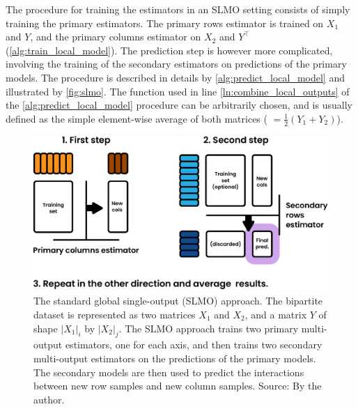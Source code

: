 The procedure for training the estimators in an SLMO setting consists of simply training the primary estimators. The primary rows estimator is trained on $X_1$ and $Y$, and the primary columns estimator on $X_2$ and $Y^\intercal$ (\autoref{alg:train_local_model}). The prediction step is however more complicated, involving the training of the secondary estimators on predictions of the primary models.
The procedure is described in details by \autoref{alg:predict_local_model} and illustrated by \autoref{fig:slmo}. The \KwCombine function used in line \autoref{ln:combine_local_outputs} of the \autoref{alg:predict_local_model} procedure can be arbitrarily chosen, and is usually defined as the simple element-wise average of both matrices ( $= \frac{1}{2}(Y_1 + Y_2)$).

\begin{figure}[tb]
    \centering
    \includegraphics[width=.6\textwidth]{figures/lmo.pdf}
    \caption{
        The standard global single-output (SLMO) approach. The bipartite dataset is represented as two matrices $X_1$ and $X_2$, and a matrix $Y$ of shape $|X_1|_i$ by $|X_2|_j$. The SLMO approach trains two primary multi-output estimators, one for each axis, and then trains two secondary multi-output estimators on the predictions of the primary models. The secondary models are then used to predict the interactions between new row samples and new column samples.
        \newline Source: By the author.
    }
    \label{fig:slmo}
\end{figure}

